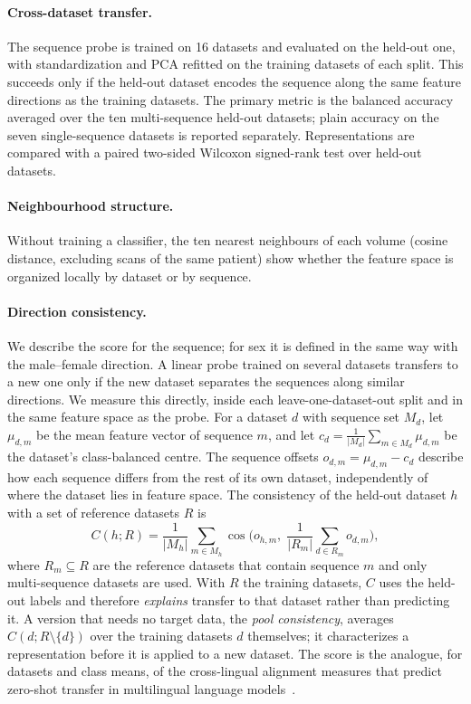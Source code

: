 \documentclass[11pt]{article}
\begin{document}
\paragraph{Cross-dataset transfer.}
The sequence probe is trained on 16 datasets and evaluated on the held-out
one, with standardization and PCA refitted on the training datasets of each
split. This succeeds only if the held-out dataset encodes the sequence along
the same feature directions as the training datasets. The primary metric is
the balanced accuracy averaged over the ten multi-sequence held-out
datasets; plain accuracy on the seven single-sequence datasets is reported
separately. Representations are compared with a paired two-sided Wilcoxon
signed-rank test over held-out datasets.

\paragraph{Neighbourhood structure.}
Without training a classifier, the ten nearest neighbours of each volume
(cosine distance, excluding scans of the same patient) show whether the
feature space is organized locally by dataset or by sequence.

\paragraph{Direction consistency.}
We describe the score for the sequence; for sex it is defined in the same way
with the male--female direction. A linear probe trained on several datasets transfers to a new one only if the
new dataset separates the sequences along similar directions. We measure this
directly, inside each leave-one-dataset-out split and in the same feature space
as the probe. For a dataset $d$ with sequence set $M_d$, let $\mu_{d,m}$ be
the mean feature vector of sequence $m$, and let
$c_d=\frac{1}{|M_d|}\sum_{m\in M_d}\mu_{d,m}$ be the dataset's
class-balanced centre. The sequence offsets $o_{d,m}=\mu_{d,m}-c_d$ describe
how each sequence differs from the rest of its own dataset, independently of
where the dataset lies in feature space. The consistency of the held-out
dataset $h$ with a set of reference datasets $R$ is
\begin{equation}
  C(h;R)=\frac{1}{|M_h|}\sum_{m\in M_h}\cos\!\Big(o_{h,m},\;
  \frac{1}{|R_m|}\sum_{d\in R_m}o_{d,m}\Big),
\end{equation}
where $R_m\subseteq R$ are the reference datasets that contain sequence $m$
and only multi-sequence datasets are used. With $R$ the training datasets,
$C$ uses the held-out labels and therefore \emph{explains} transfer to that
dataset rather than predicting it. A version that needs no target data, the
\emph{pool consistency}, averages $C(d;R\setminus\{d\})$ over the training
datasets $d$ themselves; it characterizes a representation before it is
applied to a new dataset. The score is the analogue, for datasets and class
means, of the cross-lingual alignment measures that predict zero-shot
transfer in multilingual language models~\cite{muller_first_2021,
deshpande_when_2022}.
\end{document}
